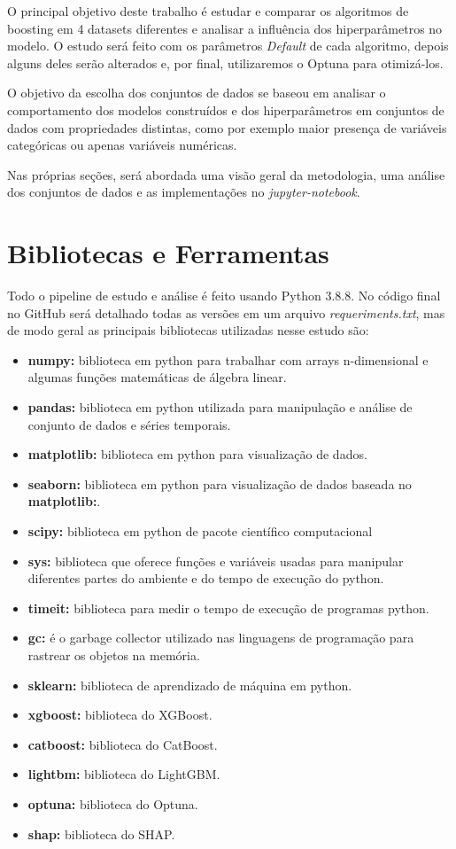 
\label{cap:desen}
O principal objetivo deste trabalho é estudar e comparar os algoritmos de boosting em 4 datasets diferentes e analisar a influência dos hiperparâmetros no modelo. O estudo será feito com os parâmetros \textit{Default} de cada algoritmo, depois alguns deles serão alterados e, por final, utilizaremos o Optuna para otimizá-los.

O objetivo da escolha dos conjuntos de dados se baseou em analisar o comportamento dos modelos construídos e dos hiperparâmetros em conjuntos de dados com propriedades distintas, como por exemplo maior presença de variáveis categóricas ou apenas variáveis numéricas.

Nas próprias seções, será abordada uma visão geral da metodologia, uma análise dos conjuntos de dados e as implementações no \textit{jupyter-notebook}.

\section{Bibliotecas e Ferramentas}
Todo o pipeline de estudo e análise é feito usando Python 3.8.8. No código final no GitHub será detalhado todas as versões em um arquivo \textit{requeriments.txt}, mas de modo geral as principais bibliotecas utilizadas nesse estudo são:
\begin{itemize}
    \item \textbf{numpy:} biblioteca em python para trabalhar com arrays n-dimensional e algumas funções matemáticas de álgebra linear.
    \item \textbf{pandas:} biblioteca em python utilizada para manipulação e análise de conjunto de dados e séries temporais.
    \item \textbf{matplotlib:} biblioteca em python para visualização de dados.
    \item \textbf{seaborn:} biblioteca em python para visualização de dados baseada no \textbf{matplotlib:}.
    \item \textbf{scipy:} biblioteca em python de pacote científico computacional
    \item \textbf{sys:} biblioteca que oferece funções e variáveis usadas para manipular diferentes partes do ambiente e do tempo de execução do python.
    \item \textbf{timeit:} biblioteca para medir o tempo de execução de programas python.
    \item \textbf{gc:} é o garbage collector utilizado nas linguagens de programação para rastrear os objetos na memória.
    \item \textbf{sklearn:} biblioteca de aprendizado de máquina em python.
    \item \textbf{xgboost:} biblioteca do XGBoost.
    \item \textbf{catboost:} biblioteca do CatBoost.
    \item \textbf{lightbm:} biblioteca do LightGBM.
    \item \textbf{optuna:} biblioteca do Optuna.
    \item \textbf{shap:} biblioteca do SHAP.
\end{itemize}

